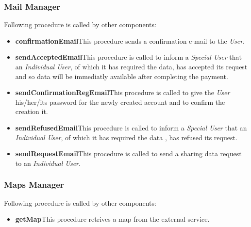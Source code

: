 \subsubsection{Mail Manager}
Following procedure is called by other components:
\begin{itemize}
  \item \textbf{confirmationEmail}\quad This procedure sends a confirmation e-mail to the \textit{User}.
  \item \textbf{sendAcceptedEmail}\quad This procedure is called to inform a \textit{Special User} that an \textit{Individual User}, of which it has required the data, has accepted its request and so data will be immediatly available after completing the payment.
  \item \textbf{sendConfirmationRegEmail}\quad This procedure is called to give the \textit{User} his/her/its password for the newly created account and to confirm the creation it.
  \item \textbf{sendRefusedEmail}\quad This procedure is called to inform a \textit{Special User} that an \textit{Individual User}, of which it has required the data , has refused its request.
  \item \textbf{sendRequestEmail}\quad This procedure is called to send a sharing data request to an \textit{Individual User}.
\end{itemize}

\subsubsection{Maps Manager}
Following procedure is called by other components:
\begin{itemize}
  \item \textbf{getMap}\quad This procedure retrives a map from the external service.
\end{itemize}

